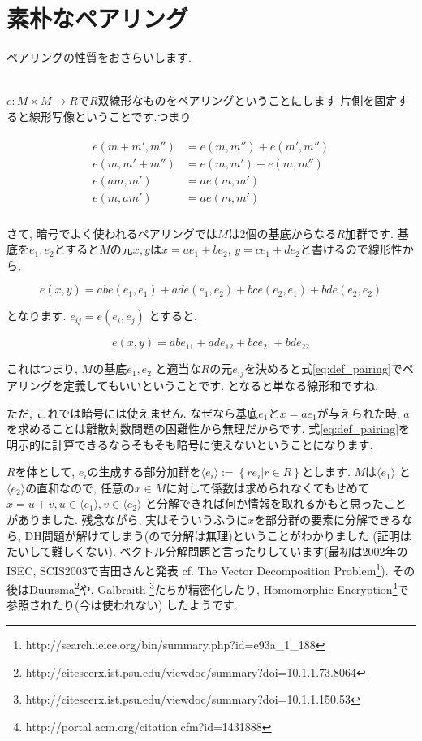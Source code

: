 \documentclass{jsarticle}
\theoremstyle{definition}
\numberwithin{theorem}{section}
\begin{document}
\section{素朴なペアリング}
ペアリングの性質をおさらいします.

\hrulefill\\

$e: M\times M \rightarrow R$で$R$双線形なものをペアリングということにします  片側を固定すると線形写像ということです.つまり

\begin{eqnarray*}
\begin{aligned}
e(m+m', m'') &= e(m, m'') + e(m', m'')\\
e(m, m'+m'') &= e(m, m') + e(m, m'')\\
e(am, m') &= ae(m, m')\\
e(m, am') &= ae(m, m')\\
\end{aligned}
\end{eqnarray*}

さて, 暗号でよく使われるペアリングでは$M$は2個の基底からなる$R$加群です. 基底を$e_1, e_2$とすると$M$の元$x, y$は$x = ae_1+be_2$, 
$y = ce_1 + de_2$と書けるので線形性から, 

$$
e(x, y) = ab e(e_1, e_1) + ad e(e_1, e_2) + bc e(e_2, e_1) + bd e(e_2, e_2)
$$

となります. $e_{ij} = e(e_i, e_j)$ とすると, 

\begin{equation}
\label{eq:def_pairing}
e(x, y) = ab e_{11} + ad e_{12} + bc e_{21} + bd e_{22}
\end{equation}

これはつまり, $M$の基底$e_1, e_2$ と適当な$R$の元$e_{ij}$を決めると式\ref{eq:def_pairing}でペアリングを定義してもいいということです. となると単なる線形和ですね.

ただ, これでは暗号には使えません. なぜなら基底$e_1$と$x = ae_1$が与えられた時, $a$を求めることは離散対数問題の困難性から無理だからです. 
式\ref{eq:def_pairing}を明示的に計算できるならそもそも暗号に使えないということになります. 

$R$を体として, $e_i$の生成する部分加群を$\langle e_i \rangle := \left\{re_i | r \in R\right\}$とします. $M$は$\langle e_1\rangle$
と$\langle e_2\rangle$の直和なので, 任意の$x\in M$に対して係数は求められなくてもせめて$x = u+v, u \in \langle e_1\rangle, v \in \langle e_2\rangle$
と分解できれば何か情報を取れるかもと思ったことがありました. 残念ながら, 実はそういうふうに$x$を部分群の要素に分解できるなら, DH問題が解けてしまう(ので分解は無理)ということがわかりました
(証明はたいして難しくない). ベクトル分解問題と言ったりしています(最初は2002年のISEC, SCIS2003で吉田さんと発表 cf. 
The Vector Decomposition Problem\footnote{http://search.ieice.org/bin/summary.php?id=e93\-a\_1\_188}). 
その後はDuursma\footnote{http://citeseerx.ist.psu.edu/viewdoc/summary?doi=10.1.1.73.8064}や, Galbraith
\footnote{http://citeseerx.ist.psu.edu/viewdoc/summary?doi=10.1.1.150.53}たちが精密化したり, 
Homomorphic Encryption\footnote{http://portal.acm.org/citation.cfm?id=1431888}で参照されたり(今は使われない)
したようです. 
\end{document}
